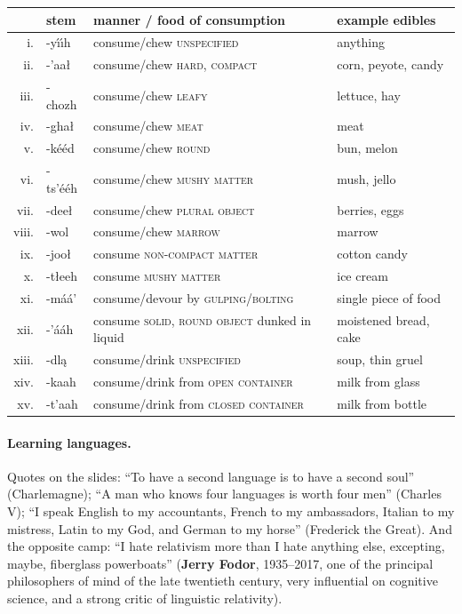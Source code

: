 \begin{center}
\small
\begin{tabular}{@{}r l l l@{}}
\toprule
 & \textbf{stem} & \textbf{manner / food of consumption} & \textbf{example edibles} \\
\midrule
i.    & -y\'{\i}\'{\i}h & consume/chew \textsc{unspecified} & anything \\
ii.   & -'aa\l   & consume/chew \textsc{hard, compact} & corn, peyote, candy \\
iii.  & -chozh   & consume/chew \textsc{leafy} & lettuce, hay \\
iv.   & -gha\l   & consume/chew \textsc{meat} & meat \\
v.    & -k\'e\'ed & consume/chew \textsc{round} & bun, melon \\
vi.   & -ts'\'e\'eh & consume/chew \textsc{mushy matter} & mush, jello \\
vii.  & -dee\l   & consume/chew \textsc{plural object} & berries, eggs \\
viii. & -wol     & consume/chew \textsc{marrow} & marrow \\
ix.   & -joo\l   & consume \textsc{non-compact matter} & cotton candy \\
x.    & -t\l eeh & consume \textsc{mushy matter} & ice cream \\
xi.   & -m\'a\'a' & consume/devour by \textsc{gulping/bolting} & single piece of food \\
xii.  & -'\'a\'ah & consume \textsc{solid, round object} dunked in liquid & moistened
  bread, cake \\
xiii. & -dl\k{a} & consume/drink \textsc{unspecified} & soup, thin gruel \\
xiv.  & -kaah    & consume/drink from \textsc{open container} & milk from glass \\
xv.   & -t'aah   & consume/drink from \textsc{closed container} & milk from bottle \\
\bottomrule
\end{tabular}
\end{center}

\paragraph{Learning languages.} Quotes on the slides: ``To have a second language is to
have a second soul'' (Charlemagne); ``A man who knows four languages is worth four men''
(Charles V); ``I speak English to my accountants, French to my ambassadors, Italian to my
mistress, Latin to my God, and German to my horse'' (Frederick the Great). And the
opposite camp: ``I hate relativism more than I hate anything else, excepting, maybe,
fiberglass powerboats'' (\textbf{Jerry Fodor}, 1935--2017, one of the principal
philosophers of mind of the late twentieth century, very influential on cognitive
science, and a strong critic of linguistic relativity).

